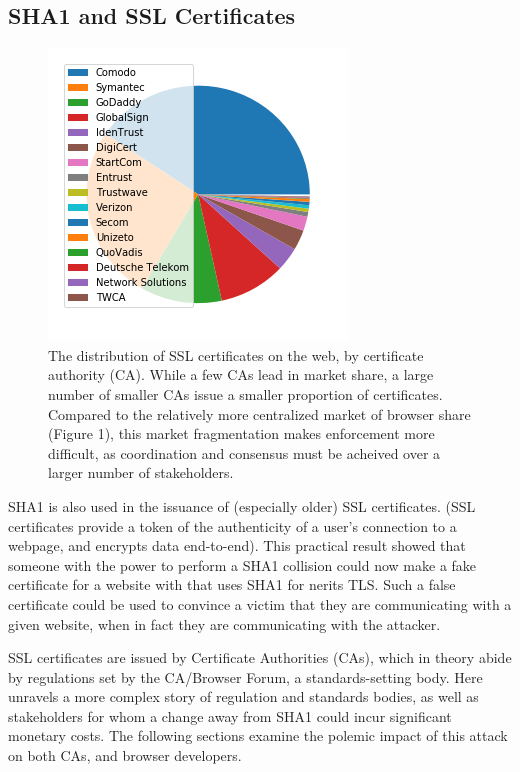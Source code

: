 \documentclass[sigconf]{acmart}
\begin{document}
\subsection{SHA1 and SSL Certificates}
\label{sec:orgd2ac60b}

\begin{figure}[t!]
\centering
\includegraphics[width=.9\linewidth]{./figures/ca-share.png}
\caption{The distribution of SSL certificates on the web, by certificate authority (CA). While a few CAs lead in market share, a large number of smaller CAs issue a smaller proportion of certificates. Compared to the relatively more centralized market of browser share (Figure 1), this market fragmentation makes enforcement more difficult, as coordination and consensus must be acheived over a larger number of stakeholders.}
\end{figure}

SHA1 is also used in the issuance of (especially older) SSL certificates.
(SSL certificates
provide a token of the authenticity of a user's connection to a webpage,
and encrypts data end-to-end).
This practical result showed that someone with the power to perform a SHA1 collision could
now make a fake certificate for a website with that uses SHA1 for nerits TLS.
Such a false certificate could
be used to convince a victim that they are communicating with a given website,
when in fact they are communicating with the attacker.

SSL certificates are issued by Certificate Authorities (CAs), which in theory abide by 
regulations set by the CA/Browser Forum, a standards-setting body.
Here unravels a more complex story of regulation and standards bodies,
as well as stakeholders for whom a change away from SHA1 could incur significant monetary costs.
The following sections examine the polemic impact of this attack on both CAs, and browser developers. 
\end{document}

